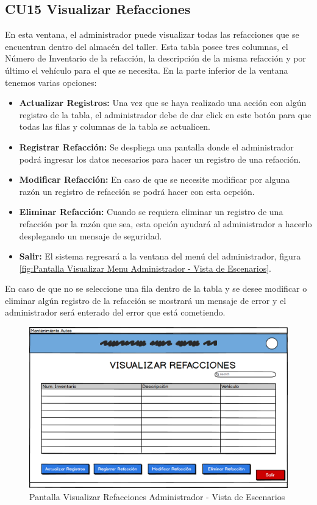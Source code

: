 \subsection{CU15 Visualizar Refacciones}
En esta ventana, el administrador puede visualizar todas las refacciones que se encuentran dentro del almacén del taller. Esta tabla posee tres columnas, el Número de Inventario de la refacción, la descripción de la misma refacción y por último el vehículo para el que se necesita. En la parte inferior de la ventana tenemos varias opciones:
\begin{itemize}
	\item \textbf{Actualizar Registros:} Una vez que se haya realizado una acción con algún registro de la tabla, el administrador debe de dar click en este botón para que todas las filas y columnas de la tabla se actualicen.
	\item \textbf{Registrar Refacción:} Se despliega una pantalla donde el administrador podrá ingresar los datos necesarios para hacer un registro de una refacción.
	\item \textbf{Modificar Refacción:} En caso de que se necesite modificar por alguna razón un registro de refacción se podrá hacer con esta ocpción.
	\item \textbf{Eliminar Refacción:} Cuando se requiera eliminar un registro de una refacción por la razón que sea, esta opción ayudará al administrador a hacerlo desplegando un mensaje de seguridad.
	\item \textbf{Salir: }El sistema regresará a la ventana del menú del administrador, figura \ref{fig:Pantalla Visualizar Menu Administrador - Vista de Escenarios}. 
\end{itemize}
En caso de que no se seleccione una fila dentro de la tabla y se desee modificar o eliminar algún registro de la refacción se mostrará un mensaje de error y el administrador será enterado del error que está cometiendo. 
\begin{figure}[!h]
	\centering
	\includegraphics[width=1\textwidth]{./diseno/vescenarios/imagenes/VisualizasRefacciones}
	\caption{Pantalla Visualizar Refacciones Administrador - Vista de Escenarios}
	\label{fig:Pantalla Visualizar Refacciones Administrador - Vista de Escenarios}
\end{figure}
